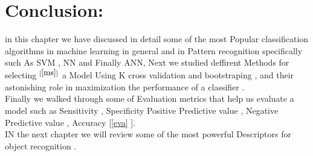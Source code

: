 \section{Conclusion:}

in this chapter we have discussed in detail some of the most Popular classification algorithms in machine learning in general and  in Pattern recognition specifically such As SVM , NN and Finally ANN, Next we studied deffirent Methods for selecting $^{[\ref{ms}]}$ a Model Using K cross validation and bootstraping , and their astonishing role in maximization the performance of a classifier . \\
Finally we walked through some of Evaluation metrics that help us evaluate a model such as Sensitivity , Specificity  Positive Predictive value , Negative Predictive value , Accuracy [\ref{eva} ]. \\
\newline
\newline
IN the next chapter we will review some of the most powerful Descriptors for object recognition .
